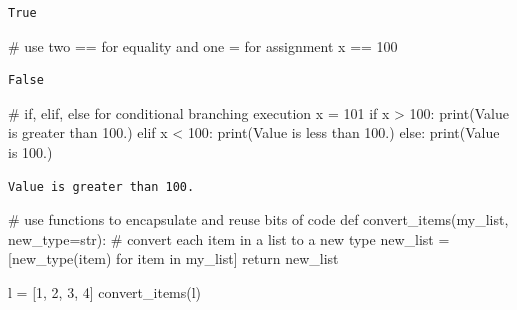 \documentclass[
  letterpaper,
  DIV=11,
  numbers=noendperiod]{scrreprt}
\newenvironment{Shaded}{\begin{snugshade}}{\end{snugshade}}
\newcommand{\BuiltInTok}[1]{\textcolor[rgb]{0.00,0.23,0.31}{#1}}
\newcommand{\CommentTok}[1]{\textcolor[rgb]{0.37,0.37,0.37}{#1}}
\newcommand{\ControlFlowTok}[1]{\textcolor[rgb]{0.00,0.23,0.31}{#1}}
\newcommand{\DecValTok}[1]{\textcolor[rgb]{0.68,0.00,0.00}{#1}}
\newcommand{\KeywordTok}[1]{\textcolor[rgb]{0.00,0.23,0.31}{#1}}
\newcommand{\NormalTok}[1]{\textcolor[rgb]{0.00,0.23,0.31}{#1}}
\newcommand{\OperatorTok}[1]{\textcolor[rgb]{0.37,0.37,0.37}{#1}}
\newcommand{\StringTok}[1]{\textcolor[rgb]{0.13,0.47,0.30}{#1}}
\begin{document}
\begin{verbatim}
True
\end{verbatim}

\begin{Shaded}
\begin{Highlighting}[]
\CommentTok{\# use two == for equality and one = for assignment}
\NormalTok{x }\OperatorTok{==} \DecValTok{100}
\end{Highlighting}
\end{Shaded}

\begin{verbatim}
False
\end{verbatim}

\begin{Shaded}
\begin{Highlighting}[]
\CommentTok{\# if, elif, else for conditional branching execution}
\NormalTok{x }\OperatorTok{=} \DecValTok{101}
\ControlFlowTok{if}\NormalTok{ x }\OperatorTok{\textgreater{}} \DecValTok{100}\NormalTok{:}
    \BuiltInTok{print}\NormalTok{(}\StringTok{\textquotesingle{}Value is greater than 100.\textquotesingle{}}\NormalTok{)}
\ControlFlowTok{elif}\NormalTok{ x }\OperatorTok{\textless{}} \DecValTok{100}\NormalTok{:}
    \BuiltInTok{print}\NormalTok{(}\StringTok{\textquotesingle{}Value is less than 100.\textquotesingle{}}\NormalTok{)}
\ControlFlowTok{else}\NormalTok{:}
    \BuiltInTok{print}\NormalTok{(}\StringTok{\textquotesingle{}Value is 100.\textquotesingle{}}\NormalTok{)}
\end{Highlighting}
\end{Shaded}

\begin{verbatim}
Value is greater than 100.
\end{verbatim}

\begin{Shaded}
\begin{Highlighting}[]
\CommentTok{\# use functions to encapsulate and reuse bits of code}
\KeywordTok{def}\NormalTok{ convert\_items(my\_list, new\_type}\OperatorTok{=}\BuiltInTok{str}\NormalTok{):}
    \CommentTok{\# convert each item in a list to a new type}
\NormalTok{    new\_list }\OperatorTok{=}\NormalTok{ [new\_type(item) }\ControlFlowTok{for}\NormalTok{ item }\KeywordTok{in}\NormalTok{ my\_list]}
    \ControlFlowTok{return}\NormalTok{ new\_list}

\NormalTok{l }\OperatorTok{=}\NormalTok{ [}\DecValTok{1}\NormalTok{, }\DecValTok{2}\NormalTok{, }\DecValTok{3}\NormalTok{, }\DecValTok{4}\NormalTok{]}
\NormalTok{convert\_items(l)}
\end{Highlighting}
\end{Shaded}
\end{document}
